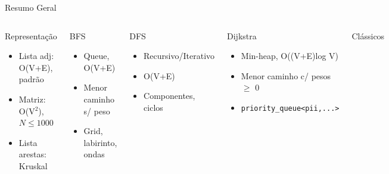 \documentclass[aspectratio=169,10pt]{beamer}
\begin{document}
\begin{frame}[shrink=2]{Resumo Geral}
  \begin{columns}[t]
      \begin{block}{Representação}
        \begin{itemize}\footnotesize
          \item Lista adj: O(V+E), padrão
          \item Matriz: O(V$^2$), $N \le 1000$
          \item Lista arestas: Kruskal
        \end{itemize}
      \end{block}
      \vspace{0.05cm}
      \begin{block}{BFS}
        \begin{itemize}\footnotesize
          \item Queue, O(V+E)
          \item Menor caminho s/ peso
          \item Grid, labirinto, ondas
        \end{itemize}
      \end{block}
      \begin{block}{DFS}
        \begin{itemize}\footnotesize
          \item Recursivo/Iterativo
          \item O(V+E)
          \item Componentes, ciclos
        \end{itemize}
      \end{block}
      \vspace{0.05cm}
      \begin{block}{Dijkstra}
        \begin{itemize}\footnotesize
          \item Min-heap, O((V+E)log V)
          \item Menor caminho c/ pesos $\ge$ 0
          \item \texttt{priority\_queue<pii,...>}
        \end{itemize}
      \end{block}
      \begin{block}{Clássicos}
        \begin{itemize}\footnotesize

\end{itemize}
\end{block}
\end{columns}
\end{frame}
\end{document}
